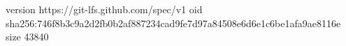 version https://git-lfs.github.com/spec/v1
oid sha256:746f8b3c9a2d2fb0b2af887234cad9fe7d97a84508e6d6e1c6be1afa9ae8116e
size 43840
